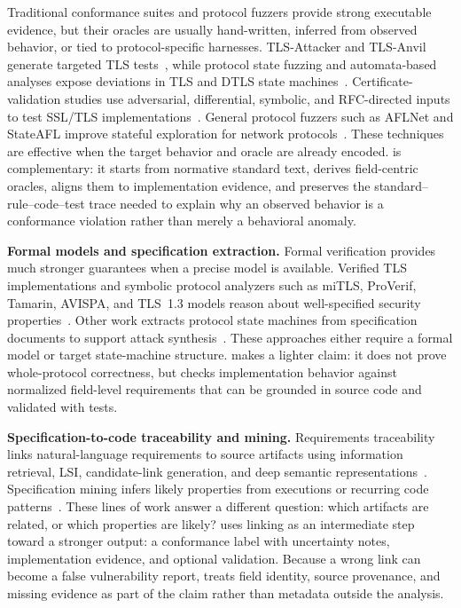 Traditional conformance suites and protocol fuzzers provide strong executable evidence, but their oracles are usually hand-written, inferred from observed behavior, or tied to protocol-specific harnesses. 
TLS-Attacker and TLS-Anvil generate targeted TLS tests~\cite{somorovsky2016tlsattacker,maehren2022tlsanvil}, while protocol state fuzzing and automata-based analyses expose deviations in TLS and DTLS state machines~\cite{de2015protocol,fiterau2020dtls,fiterau2023automata,beurdouche2015messy}. 
Certificate-validation studies use adversarial, differential, symbolic, and RFC-directed inputs to test SSL/TLS implementations~\cite{brubaker2014frankencert,chen2015guided,chen2018rfc,chen2017hvlearn,chau2017symcerts}. 
General protocol fuzzers such as AFLNet and StateAFL improve stateful exploration for network protocols~\cite{pham2020aflnet,natella2022stateafl,natella2021profuzzbench,ba2022stateful}. 
These techniques are effective when the target behavior and oracle are already encoded. 
\tool{} is complementary: it starts from normative standard text, derives field-centric oracles, aligns them to implementation evidence, and preserves the standard--rule--code--test trace needed to explain why an observed behavior is a conformance violation rather than merely a behavioral anomaly.

\textbf{Formal models and specification extraction.}
Formal verification provides much stronger guarantees when a precise model is
available. Verified TLS implementations and symbolic protocol analyzers such as
miTLS, ProVerif, Tamarin, AVISPA, and TLS~1.3 models reason about
well-specified security properties~\cite{bhargavan2013mitls,blanchet2016proverif,meier2013tamarin,armando2005avispa,cremers2017tls13}.
Other work extracts protocol state machines from specification documents to
support attack synthesis~\cite{pacheco2022automated}. These approaches either
require a formal model or target state-machine structure. \tool{} makes a
lighter claim: it does not prove whole-protocol correctness, but checks
implementation behavior against normalized field-level requirements that can be
grounded in source code and validated with tests.

\textbf{Specification-to-code traceability and mining.}
Requirements traceability links natural-language requirements to source
artifacts using information retrieval, LSI, candidate-link generation, and deep
semantic representations~\cite{antoniol2002recovering,marcus2003recovering,hayes2006advancing,clelandhuang2014software,guo2017semantically}.
Specification mining infers likely properties from executions or recurring code
patterns~\cite{ernst2001dynamically,engler2001bugs,engler2001checking}.
These lines of work answer a different question: which artifacts are related,
or which properties are likely? \tool{} uses linking as an intermediate step
toward a stronger output: a conformance label with uncertainty notes,
implementation evidence, and optional validation. Because a wrong link can
become a false vulnerability report, \tool{} treats field identity, source
provenance, and missing evidence as part of the claim rather than metadata
outside the analysis.
